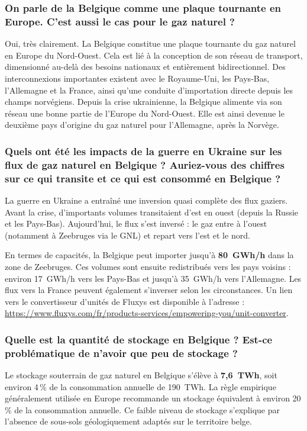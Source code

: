 \subsubsection{On parle de la Belgique comme une plaque tournante en Europe. C'est aussi le cas pour le gaz naturel ?}

Oui, très clairement. La Belgique constitue une plaque tournante du gaz naturel en Europe du Nord-Ouest. Cela est lié à la conception de son réseau de transport, dimensionné au-delà des besoins nationaux et entièrement bidirectionnel. Des interconnexions importantes existent avec le Royaume-Uni, les Pays-Bas, l'Allemagne et la France, ainsi qu'une conduite d'importation directe depuis les champs norvégiens. Depuis la crise ukrainienne, la Belgique alimente via son réseau une bonne partie de l'Europe du Nord-Ouest. Elle est ainsi devenue le deuxième pays d'origine du gaz naturel pour l'Allemagne, après la Norvège.

\subsubsection{Quels ont été les impacts de la guerre en Ukraine sur les flux de gaz naturel en Belgique ? Auriez-vous des chiffres sur ce qui transite et ce qui est consommé en Belgique ?}

La guerre en Ukraine a entraîné une inversion quasi complète des flux gaziers. Avant la crise, d'importants volumes transitaient d'est en ouest (depuis la Russie et les Pays-Bas). Aujourd'hui, le flux s'est inversé : le gaz entre à l'ouest (notamment à Zeebruges via le GNL) et repart vers l'est et le nord.

En termes de capacités, la Belgique peut importer jusqu'à \textbf{80~GWh/h} dans la zone de Zeebruges. Ces volumes sont ensuite redistribués vers les pays voisins : environ 17~GWh/h vers les Pays-Bas et jusqu'à 35~GWh/h vers l'Allemagne. Les flux vers la France peuvent également s'inverser selon les circonstances. Un lien vers le convertisseur d'unités de Fluxys est disponible à l'adresse : \url{https://www.fluxys.com/fr/products-services/empowering-you/unit-converter}.

\subsubsection{Quelle est la quantité de stockage en Belgique ? Est-ce problématique de n'avoir que peu de stockage ?}

Le stockage souterrain de gaz naturel en Belgique s'élève à \textbf{7,6~TWh}, soit environ 4\,\% de la consommation annuelle de 190~TWh. La règle empirique généralement utilisée en Europe recommande un stockage équivalent à environ 20\,\% de la consommation annuelle. Ce faible niveau de stockage s'explique par l'absence de sous-sols géologiquement adaptés sur le territoire belge.

